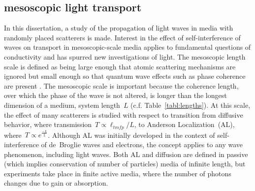 \subsection{mesoscopic light transport}
\label{sec:what_field_am_i_in}
In this dissertation, a study of the propagation of light waves in media with randomly placed scatterers is made. Interest in the effect of self-interference of waves on transport in mesoscopic-scale media applies to fundamental questions of conductivity
\cite{1988_Stone}\cite{1997_Imry}
and has spurred new investigations of light\cite{2009_Mendez}\cite{2008_Stone}\cite{1990_Sheng}.
The mesoscopic length scale is defined as being large enough that atomic scattering mechanisms are ignored but small enough so that quantum wave effects such as phase coherence are present \cite{2005_Duan_Guojun}. %
The mesoscopic scale is important because the coherence length, over which the phase of the wave is not altered, is longer than the longest dimension of a medium, system length~$L$ (c.f. Table~\ref{tabl:lengths}). %
At this scale, the effect of many scatterers is studied with respect to transition from diffusive behavior, where transmission~$T \propto \ell_{tmfp}/L$, to Anderson Localization\cite{1958_Anderson}\cite{2009_Lagendijk_PT}~(AL), where~$T \propto e^{\frac{-L}{\xi}}$. 
Although AL was initially developed in the context of self-interference of de~Broglie waves and electrons\cite{1985_Lee}\cite{2008_Evers_Mirlin_rmp}, the concept applies to any wave phenomenon, including light waves\cite{1984_John_prl}.
 Both AL and diffusion are defined in passive (which implies conservation of number of particles) media of infinite length, but experiments %
take place in finite\cite{1979_Anderson} active media, where the number of photons changes due to gain or absorption. %
  
